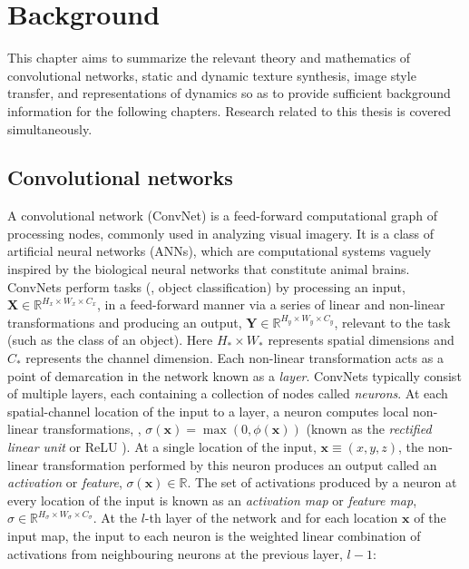 \chapter{Background}\label{chap:background}

This chapter aims to summarize the relevant theory and mathematics of
convolutional networks,
static and dynamic texture synthesis, image style transfer, and representations of dynamics so as to provide sufficient
background information for the following chapters. Research
related to this thesis is covered simultaneously.

\section{Convolutional networks}

A convolutional network (ConvNet) is a feed-forward computational graph of processing nodes, commonly used in analyzing visual imagery. It is a class of artificial neural networks (ANNs), which are computational systems vaguely inspired by the biological neural networks that constitute animal brains. ConvNets perform tasks (\eg, object classification) by processing an input, $\mathbf{X} \in \mathbb{R}^{H_x \times W_x \times C_x}$, in a feed-forward manner via a series of linear and non-linear transformations and producing an output, $\mathbf{Y} \in \mathbb{R}^{H_y \times W_y \times C_y}$, relevant to the task (such as the class of an object). Here $H_\ast \times W_\ast$ represents spatial dimensions and $C_\ast$ represents the  channel dimension. Each non-linear transformation acts as a point of demarcation in the network known as a \emph{layer}. ConvNets typically consist of multiple layers, each containing a collection of nodes called \emph{neurons}. At each spatial-channel location of the input to a layer, a neuron computes local non-linear transformations, \eg, $\sigma(\mathbf{x}) = \max{(0, \phi(\mathbf{x}))}$ (known as the \emph{rectified linear unit} or ReLU \cite{nair2010rectified}). At a single location of the input, $\mathbf{x} \equiv (x, y, z)$, the non-linear transformation performed by this neuron produces an output called an \emph{activation} or \emph{feature}, $\sigma(\mathbf{x}) \in \mathbb{R}$. The set of activations produced by a neuron at every location of the input is known as an \emph{activation map} or \emph{feature map}, $\sigma \in \mathbb{R}^{H_\sigma \times W_\sigma \times C_\sigma}$. At the $l$-th layer of the network and for each location $\mathbf{x}$ of the input map, the input to each neuron is the weighted linear combination of activations from neighbouring neurons at the previous layer, $l-1$:
